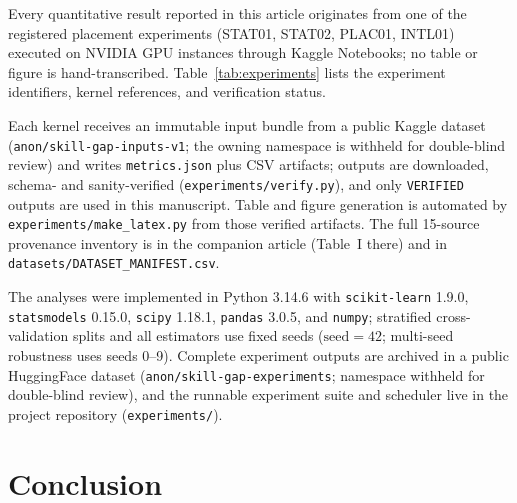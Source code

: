 \documentclass[journal]{IEEEtran}
\begin{document}
Every quantitative result reported in this article originates from one of the registered placement experiments (STAT01, STAT02, PLAC01, INTL01) executed on NVIDIA GPU instances through Kaggle Notebooks; no table or figure is hand-transcribed. Table~\ref{tab:experiments} lists the experiment identifiers, kernel references, and verification status.

\begin{table}[!htbp]
\centering
\caption{Experiment Registry: Provenance of the Placement Experiments (status per \texttt{results/registry.json})}
\label{tab:experiments}
\resizebox{\textwidth}{!}{%

}
\par\vspace{3pt}
{\footnotesize Each kernel receives an immutable input bundle from a public Kaggle dataset (\texttt{anon/skill-gap-inputs-v1}; the owning namespace is withheld for double-blind review) and writes \texttt{metrics.json} plus CSV artifacts; outputs are downloaded, schema- and sanity-verified (\texttt{experiments/verify.py}), and only \texttt{VERIFIED} outputs are used in this manuscript. Table and figure generation is automated by \texttt{experiments/make\_latex.py} from those verified artifacts. The full 15-source provenance inventory is in the companion article (Table~I there) and in \texttt{datasets/DATASET\_MANIFEST.csv}.}
\end{table}

The analyses were implemented in Python 3.14.6 with \texttt{scikit-learn} 1.9.0, \texttt{statsmodels} 0.15.0, \texttt{scipy} 1.18.1, \texttt{pandas} 3.0.5, and \texttt{numpy}; stratified cross-validation splits and all estimators use fixed seeds ($\text{seed} = 42$; multi-seed robustness uses seeds 0--9). Complete experiment outputs are archived in a public HuggingFace dataset (\texttt{anon/skill-gap-experiments}; namespace withheld for double-blind review), and the runnable experiment suite and scheduler live in the project repository (\texttt{experiments/}).

\section{Conclusion}
\label{sec:conclusion_p}
\end{document}
